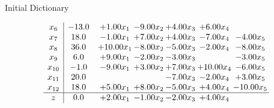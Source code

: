 \documentclass[8pt]{article}
\begin{document}
Initial Dictionary 

\[\begin{array}{c| c c@{\hskip 2pt} c@{\hskip 2pt} c@{\hskip 2pt} c@{\hskip 2pt} c@{\hskip 2pt} }
 x_{6}   &  -13.0 & +  1.00 x_{1} & -9.00 x_{2} & +  4.00 x_{3} & +  6.00 x_{4} &   \\
 x_{7}   &  18.0 & -1.00 x_{1} & +  7.00 x_{2} & +  4.00 x_{3} & -7.00 x_{4} & -4.00 x_{5}\\
 x_{8}   &  36.0 & + 10.00 x_{1} & -8.00 x_{2} & -5.00 x_{3} & -2.00 x_{4} & -8.00 x_{5}\\
 x_{9}   &  6.0 & +  9.00 x_{1} & -2.00 x_{2} & -3.00 x_{3} &   & -3.00 x_{5}\\
 x_{10}   &  -1.0 & -9.00 x_{1} & +  3.00 x_{2} & +  7.00 x_{3} & + 10.00 x_{4} & -6.00 x_{5}\\
 x_{11}   &  20.0  &    &   & -7.00 x_{3} & -2.00 x_{4} & +  3.00 x_{5}\\
 x_{12}   &  18.0 & +  5.00 x_{1} & +  8.00 x_{2} & -5.00 x_{3} & +  4.00 x_{4} & -10.00 x_{5}\\
\hline
z    &  0.0 & +  2.00 x_{1} & -1.00 x_{2} & -2.00 x_{3} & +  4.00 x_{4} &   \\
\end{array}\]
\end{document}
